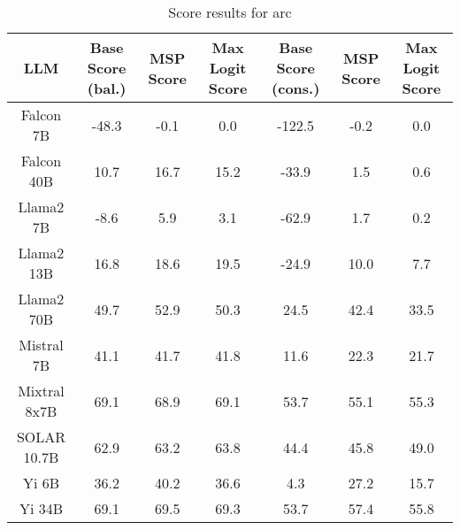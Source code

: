 \renewcommand\arraystretch{1.2}
\begin{table*}
\centering
\begin{tabular}{c|c|c|c|c|c|c}
LLM & Base Score (bal.) & MSP Score & Max Logit Score & Base Score (cons.) & MSP Score & Max Logit Score\\ \hline
Falcon 7B & -48.3 & -0.1 & 0.0 & -122.5 & -0.2 & 0.0\\
Falcon 40B & 10.7 & 16.7 & 15.2 & -33.9 & 1.5 & 0.6\\
Llama2 7B & -8.6 & 5.9 & 3.1 & -62.9 & 1.7 & 0.2\\
Llama2 13B & 16.8 & 18.6 & 19.5 & -24.9 & 10.0 & 7.7\\
Llama2 70B & 49.7 & 52.9 & 50.3 & 24.5 & 42.4 & 33.5\\
Mistral 7B & 41.1 & 41.7 & 41.8 & 11.6 & 22.3 & 21.7\\
Mixtral 8x7B & 69.1 & 68.9 & 69.1 & 53.7 & 55.1 & 55.3\\
SOLAR 10.7B & 62.9 & 63.2 & 63.8 & 44.4 & 45.8 & 49.0\\
Yi 6B & 36.2 & 40.2 & 36.6 & 4.3 & 27.2 & 15.7\\
Yi 34B & 69.1 & 69.5 & 69.3 & 53.7 & 57.4 & 55.8\\
\hline
\end{tabular}
\caption{Score results for arc}
\end{table*}
\label{tab:arc_score}
